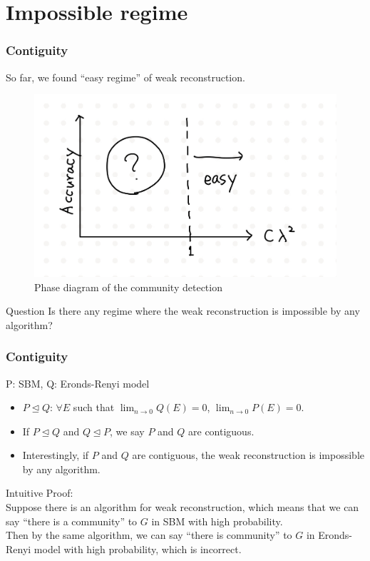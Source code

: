 \documentclass[dvipdfmx,11pt]{beamer}
\begin{document}
\section{Impossible regime}

\begin{frame}
  \frametitle{Contiguity}
  So far, we found ``easy regime'' of weak reconstruction.
  \begin{figure}
    \centering
    \includegraphics[width=0.5\linewidth]{figure/phase1.jpeg}
    \caption{Phase diagram of the community detection}
  \end{figure}
  \begin{block}{Question}
    Is there any regime where the weak reconstruction is impossible by any algorithm?
  \end{block}
\end{frame}

\begin{frame}
  \frametitle{Contiguity}
  P: SBM, Q: Eronds-Renyi model
  \begin{itemize}
    \item $P \trianglelefteq Q$: $\forall E$ such that $\lim_{n \to 0} Q(E) = 0$, $\lim_{n \to 0} P(E) = 0$.
    \item If $P \trianglelefteq Q$ and $Q \trianglelefteq P$, we say $P$ and $Q$ are \alert{contiguous}.
    \item Interestingly, if $P$ and $Q$ are contiguous, the weak reconstruction is impossible by any algorithm.
  \end{itemize}
  \alert{Intuitive Proof}: \\
  Suppose there is an algorithm for weak reconstruction, which means that we can say ``there is a community'' to $G$ in SBM with high probability. \\
  Then by the same algorithm, we can say ``there is community'' to $G$ in Eronds-Renyi model with high probability, which is incorrect.   
\end{frame}
\end{document}
